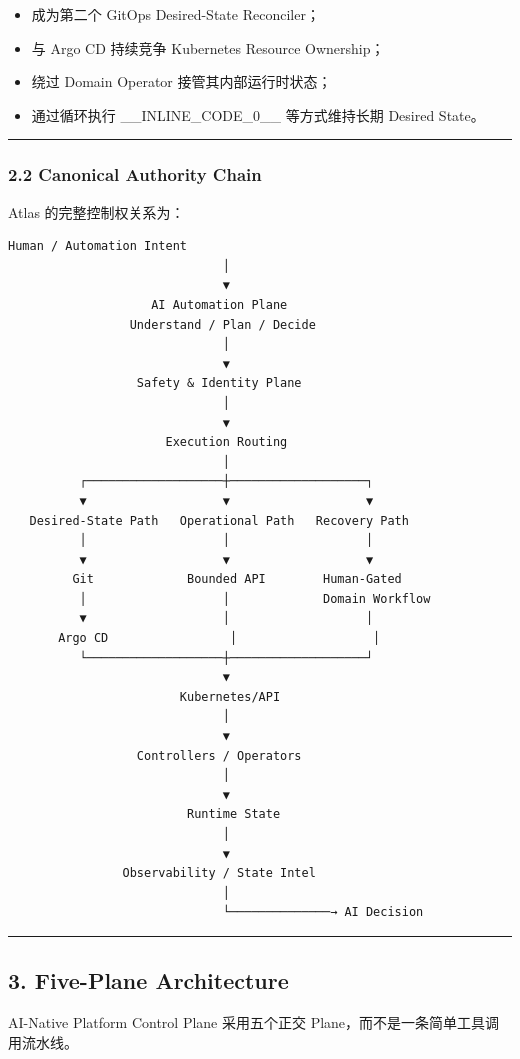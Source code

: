 \documentclass[11pt,a4paper]{article}
\begin{document}
\begin{itemize}
  \item 成为第二个 GitOps Desired-State Reconciler；
  \item 与 Argo CD 持续竞争 Kubernetes Resource Ownership；
  \item 绕过 Domain Operator 接管其内部运行时状态；
  \item 通过循环执行 \_\_INLINE\_CODE\_0\_\_ 等方式维持长期 Desired State。
\end{itemize}
\vspace{0.5em}\hrule\vspace{0.5em}
\subsubsection{2.2 Canonical Authority Chain}
Atlas 的完整控制权关系为：

\begin{lstlisting}[language=text]
                   Human / Automation Intent
                              │
                              ▼
                    AI Automation Plane
                 Understand / Plan / Decide
                              │
                              ▼
                  Safety & Identity Plane
                              │
                              ▼
                      Execution Routing
                              │
          ┌───────────────────┼───────────────────┐
          ▼                   ▼                   ▼
   Desired-State Path   Operational Path   Recovery Path
          │                   │                   │
          ▼                   ▼                   ▼
         Git             Bounded API        Human-Gated
          │                   │             Domain Workflow
          ▼                   │                   │
       Argo CD                 │                   │
          └───────────────────┼───────────────────┘
                              ▼
                        Kubernetes/API
                              │
                              ▼
                  Controllers / Operators
                              │
                              ▼
                         Runtime State
                              │
                              ▼
                Observability / State Intel
                              │
                              └──────────────→ AI Decision
\end{lstlisting}
\vspace{0.5em}\hrule\vspace{0.5em}
\subsection{3. Five-Plane Architecture}
AI-Native Platform Control Plane 采用五个正交 Plane，而不是一条简单工具调用流水线。
\end{document}
